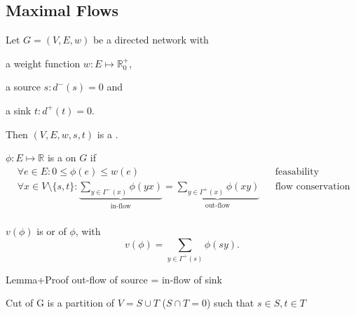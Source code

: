 

\subsection*{Maximal Flows}

\def\dminus{\ensuremath{d^{-}}}
\def\dplus{\ensuremath{d^{+}}}
\def\real{\mathbb{R}}
\def\natural{\mathbb{N}}
\def\Gammaplus{\ensuremath{\Gamma^{+}}}
\def\Gammaminus{\ensuremath{\Gamma^{-}}}

\begin{definition}
Let $G=(V,E,w)$ be a directed network with
\begin{compactitem}
\item a weight function $w: E\mapsto \real_0^{+}$,
\item a source $s: \dminus(s) = 0$ and
\item a sink $t: \dplus(t) = 0$.
\end{compactitem}
Then $(V, E, w, s, t)$ is a .
\end{definition}

\begin{definition}
$\phi: E\mapsto \real$ is a  on $G$ if
\begin{align*}
  &\forall e\in E: 0 ≤ \phi(e) ≤ w(e)
     &&\text{feasability condition} \\
  &\forall x\in V\setminus\{s,t\}:
     \underbrace{\sum_{y\in \Gammaminus(x)} \phi(yx)}_{\text{in-flow}} =
     \underbrace{\sum_{y\in \Gammaplus(x)} \phi(xy)}_{\text{out-flow}}
     &&\text{flow conservation condition} \\
\end{align*}
\end{definition}

\begin{definition}
$v(\phi)$ is  or  of $\phi$, with
\[
  v(\phi) = \sum_{y\in \Gammaplus(s)} \phi(sy).
\]
\end{definition}

\TODO Lemma+Proof out-flow of source = in-flow of sink


\begin{definition}
Cut of G is a partition of $V=S \cup T$ ($S\cap T=0$) such that
$s \in S,t \in T$
\end{definition}


